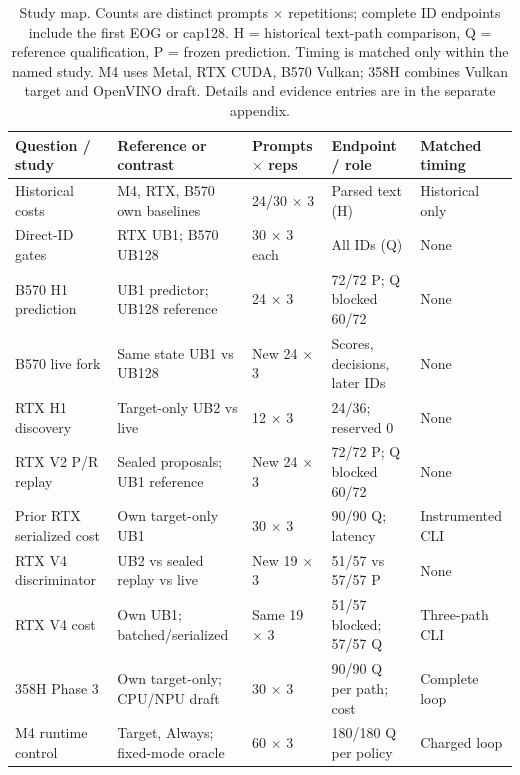 \begin{table}[t]
\caption{Study map. Counts are distinct prompts $\times$ repetitions; complete ID endpoints include the first EOG or cap128. H = historical text-path comparison, Q = reference qualification, P = frozen prediction. Timing is matched only within the named study. M4 uses Metal, RTX CUDA, B570 Vulkan; 358H combines Vulkan target and OpenVINO draft. Details and evidence entries are in the separate appendix.}
\label{tab:studymap}
\label{tab:platforms}
\centering
\begin{tabular}{@{}p{1.26in}p{1.50in}p{.65in}p{1.40in}p{1.15in}@{}}
\toprule
Question / study & Reference or contrast & Prompts $\times$ reps & Endpoint / role & Matched timing \\
\midrule
Historical costs & M4, RTX, B570 own baselines & 24/30 $\times$ 3 & Parsed text (H) & Historical only \\
Direct-ID gates & RTX UB1; B570 UB128 & 30 $\times$ 3 each & All IDs (Q) & None \\
B570 H1 prediction & UB1 predictor; UB128 reference & 24 $\times$ 3 & 72/72 P; Q blocked 60/72 & None \\
B570 live fork & Same state UB1 vs UB128 & New 24 $\times$ 3 & Scores, decisions, later IDs & None \\
RTX H1 discovery & Target-only UB2 vs live & 12 $\times$ 3 & 24/36; reserved 0 & None \\
RTX V2 P/R replay & Sealed proposals; UB1 reference & New 24 $\times$ 3 & 72/72 P; Q blocked 60/72 & None \\
Prior RTX serialized cost & Own target-only UB1 & 30 $\times$ 3 & 90/90 Q; latency & Instrumented CLI \\
RTX V4 discriminator & UB2 vs sealed replay vs live & New 19 $\times$ 3 & 51/57 vs 57/57 P & None \\
RTX V4 cost & Own UB1; batched/serialized & Same 19 $\times$ 3 & 51/57 blocked; 57/57 Q & Three-path CLI \\
358H Phase 3 & Own target-only; CPU/NPU draft & 30 $\times$ 3 & 90/90 Q per path; cost & Complete loop \\
M4 runtime control & Target, Always; fixed-mode oracle & 60 $\times$ 3 & 180/180 Q per policy & Charged loop \\
\bottomrule
\end{tabular}
\end{table}
